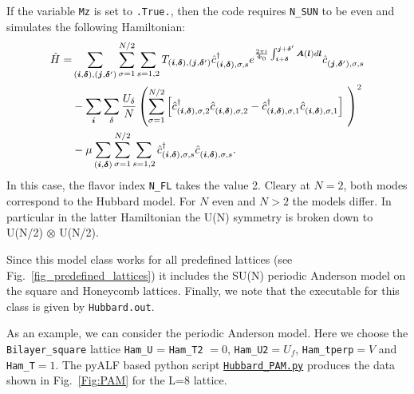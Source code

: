 If the variable \texttt{Mz} is set to \texttt{.True.}, then the code requires  \texttt{N\_SUN}  to be even and simulates the following Hamiltonian: 
\begin{align}
\hat{H} =& \sum_{(\ve{i},\ve{\delta}), (\ve{j},\ve{\delta}')}  \sum_{\sigma =1}^{N/2}  \sum_{s=1,2} T_{(\ve{i},\ve{\delta}), (\ve{j},\ve{\delta}')}    \hat{c}^{\dagger}_{(\ve{i},\ve{\delta}), \sigma,s }   e^{\frac{2 \pi i}{\Phi_0} \int_{\ve{i} + \ve{\delta}}^{\ve{j} + \ve{\delta}'}  
     \vec{A}(\ve{l})  d \ve{l}} \hat{c}^{}_{(\ve{j},\ve{\delta}'),\sigma,s}     \nonumber   \\
    &- \sum_{\vec{i}} \sum_{\delta}   \frac{U_\delta}{N} \left(\sum_{\sigma=1}^{N/2}  \left[   \hat{c}^{\dagger}_{(\vec{i},\ve{\delta}),\sigma, 2} 
    \hat{c}^{\phantom\dagger}_{(\vec{i}, \ve{\delta}),\sigma,2 }  -  \hat{c}^{\dagger}_{(\vec{i},\ve{\delta}),\sigma, 1} 
    \hat{c}^{\phantom\dagger}_{(\vec{i}, \ve{\delta}),\sigma,1} \right] \right)^2  \nonumber \\
    & - \mu \sum_{(\ve{i},\ve{\delta})}  \sum_{\sigma =1}^{N/2}  \sum_{s=1,2}\hat{c}^{\dagger}_{(\vec{i},\ve{\delta}),\sigma, s} \hat{c}^{\phantom\dagger}_{(\vec{i},\ve{\delta}),\sigma, s}.
\end{align}
In this case, the flavor index \texttt{N\_FL}   takes the value 2. Cleary at $N=2$, both modes  correspond  to the Hubbard model.  For $N$  even and $N > 2$  the models differ.  In particular  in the latter  Hamiltonian the U(N) symmetry is broken down to  U(N/2) $\otimes$ U(N/2).  

Since this model class  works for all predefined lattices  (see Fig.~\ref{fig_predefined_lattices}) 
it includes the SU(N) periodic Anderson model on the square and Honeycomb lattices.
Finally, we note that the executable for this class is given by \texttt{Hubbard.out}.

As an example,  we can consider the periodic Anderson model.   Here we choose  the \texttt{Bilayer\_square}  lattice \texttt{Ham\_U} =  \texttt{Ham\_T2} $= 0$,  \texttt{Ham\_U2}$=U_f$,  \texttt{Ham\_tperp}$=V$  and \texttt{Ham\_T}$=1$.   The  pyALF  based python script    \href{https://git.physik.uni-wuerzburg.de/ALF/pyALF/-/blob/master/Scripts/Hubbard_PAM.py}{\texttt{Hubbard\_PAM.py}}  produces the data  shown in  Fig.~\ref{Fig:PAM}  for the L=8 lattice.  

